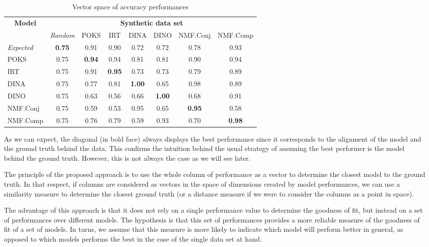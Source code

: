 \begin{table}[ht]
\caption{Vector space of accuracy performances}\label{tab:vectorspace}
\centering
\begin{tabular}{lccccccc}
  \toprule
  \multicolumn{1}{c}{\multirow{2}{*}{\textbf{Model}}} & \multicolumn{7}{c}{\textbf{Synthetic data set}}\\
  \cline{2-8}
  & \multicolumn{1}{c}{{\textit{Random}}} & \multicolumn{1}{c}{{POKS}} & \multicolumn{1}{c}{{IRT}} & \multicolumn{1}{c}{{DINA}} & \multicolumn{1}{c}{{DINO}} & \multicolumn{1}{c}{{NMF.Conj}} & \multicolumn{1}{c}{{NMF.Comp}} \\ 
  \hline
  \textit{Expected} & \textbf{0.75} & 0.91 & 0.90 & 0.72 & 0.72 & 0.78 & 0.93 \\ 
  POKS & 0.75 & \textbf{0.94} & 0.94 & 0.81 & 0.81 & 0.90 & 0.94 \\ 
  IRT & 0.75 & 0.91 & \textbf{0.95} & 0.73 & 0.73 & 0.79 & 0.89 \\ 
  DINA & 0.75 & 0.77 & 0.81 & \textbf{1.00} & 0.65 & 0.98 & 0.89 \\ 
  DINO & 0.75 & 0.63 & 0.56 & 0.66 & \textbf{1.00} & 0.68 & 0.91 \\ 
  NMF.Conj & 0.75& 0.59 & 0.53 & 0.95 & 0.65 & \textbf{0.95} & 0.58 \\ 
  NMF.Comp & 0.75 & 0.76 & 0.79 & 0.59 & 0.93 & 0.70 & \textbf{0.98} \\ 
  \bottomrule
\end{tabular}
\end{table}


As we can expect, the diagonal (in bold face) always displays the best performance since it corresponds to the alignment of the model and the ground truth behind the data.  This confirms the intuition behind the usual strategy of assuming the best performer is the model behind the ground truth.  However, this is not always the case as we will see later.

The principle of the proposed approach is to use the whole column of performance as a vector to determine the closest model to the ground truth.  In that respect, if columns are considered as vectors in the space of dimensions created by model performances, we can use a similarity measure to determine the closest ground truth (or a distance measure if we were to consider the columns as a point in space).

The advantage of this approach is that it does not rely on a single performance value to determine the goodness of fit, but instead on a set of performances over different models.  The hypothesis is that this set of performances provides a more reliable measure of the goodness of fit of a set of models.  In turns, we assume that this measure is more likely to indicate which model will perform better in general, as opposed to which models performs the best in the case of the single data set at hand.  


